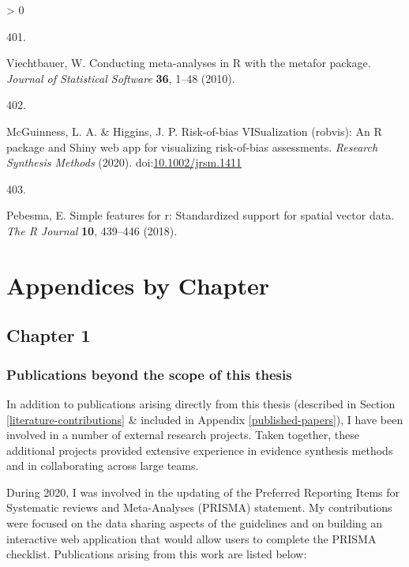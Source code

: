 \documentclass[a4paper, twoside]{templates/ociamthesis}
\newlength{\cslhangindent}
\newlength{\csllabelwidth}
\newenvironment{CSLReferences}[3] %
 {%
  \setlength{\parindent}{0pt}
  \ifodd #1 \everypar{\setlength{\hangindent}{\cslhangindent}}\ignorespaces\fi
  \ifnum #2 > 0
  \setlength{\parskip}{#2\baselineskip}
  \fi
 }%
 {}
\newcommand{\CSLLeftMargin}[1]{\parbox[t]{\maxof{\widthof{#1}}{\csllabelwidth}}{#1}}
\newcommand{\CSLRightInline}[1]{\parbox[t]{\linewidth - \csllabelwidth}{#1}}
\begin{document}
\begin{CSLReferences}{0}{0}
\leavevmode\hypertarget{ref-metafor2010}{}%
\CSLLeftMargin{401. }
\CSLRightInline{Viechtbauer, W. Conducting meta-analyses in {R} with the {metafor} package. \emph{Journal of Statistical Software} \textbf{36}, 1--48 (2010).}

\leavevmode\hypertarget{ref-robvis2020}{}%
\CSLLeftMargin{402. }
\CSLRightInline{McGuinness, L. A. \& Higgins, J. P. Risk-of-bias {VISualization} (robvis): An {R} package and {Shiny} web app for visualizing risk-of-bias assessments. \emph{Research Synthesis Methods} (2020). doi:\href{https://doi.org/10.1002/jrsm.1411}{10.1002/jrsm.1411}}

\leavevmode\hypertarget{ref-sf2018}{}%
\CSLLeftMargin{403. }
\CSLRightInline{Pebesma, E. Simple features for r: Standardized support for spatial vector data. \emph{The R Journal} \textbf{10}, 439--446 (2018).}

\end{CSLReferences}

\startappendices

\hypertarget{chapter-appendix-heading}{%
\chapter{Appendices by Chapter}\label{chapter-appendix-heading}}

\minitoc 

\newpage

\hypertarget{appendix-into}{%
\section{Chapter 1}\label{appendix-into}}

\hypertarget{appendix-publications}{%
\subsection{Publications beyond the scope of this thesis}\label{appendix-publications}}

In addition to publications arising directly from this thesis (described in Section \ref{literature-contributions} \& included in Appendix \ref{published-papers}), I have been involved in a number of external research projects. Taken together, these additional projects provided extensive experience in evidence synthesis methods and in collaborating across large teams.

During 2020, I was involved in the updating of the Preferred Reporting Items for Systematic reviews and Meta-Analyses (PRISMA) statement. My contributions were focused on the data sharing aspects of the guidelines and on building an interactive web application that would allow users to complete the PRISMA checklist. Publications arising from this work are listed below:
\end{document}
